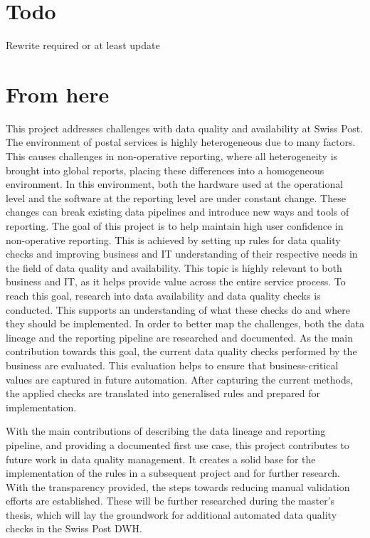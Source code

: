\section{Todo}
Rewrite required or at least update
\section{From here}

This project addresses challenges with data quality and availability at Swiss Post. The environment of postal services is highly heterogeneous due to many factors. This causes challenges in non-operative reporting, where all heterogeneity is brought into global reports, placing these differences into a homogeneous environment.
In this environment, both the hardware used at the operational level and the software at the reporting level are under constant change. These changes can break existing data pipelines and introduce new ways and tools of reporting. The goal of this project is to help maintain high user confidence in non-operative reporting. This is achieved by setting up rules for data quality checks and improving business and IT understanding of their respective needs in the field of data quality and availability. This topic is highly relevant to both business and IT, as it helps provide value across the entire service process.
To reach this goal, research into data availability and data quality checks is conducted. This supports an understanding of what these checks do and where they should be implemented. In order to better map the challenges, both the data lineage and the reporting pipeline are researched and documented.
As the main contribution towards this goal, the current data quality checks performed by the business are evaluated. This evaluation helps to ensure that business-critical values are captured in future automation. After capturing the current methods, the applied checks are translated into generalised rules and prepared for implementation.

With the main contributions of describing the data lineage and reporting pipeline, and providing a documented first use case, this project contributes to future work in data quality management. It creates a solid base for the implementation of the rules in a subsequent project and for further research. With the transparency provided, the steps towards reducing manual validation efforts are established. These will be further researched during the master’s thesis, which will lay the groundwork for additional automated data quality checks in the Swiss Post DWH.